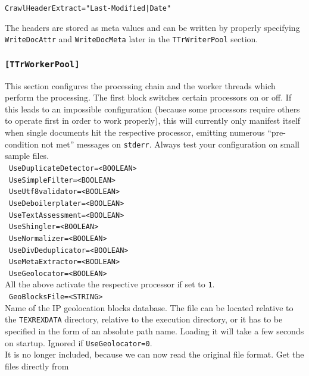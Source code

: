 \documentclass[12pt,a4paper]{article}
\begin{document}
\begin{center}
  \texttt{CrawlHeaderExtract="Last-Modified|Date"}
\end{center}

The headers are stored as meta values and can be written by properly specifying \texttt{WriteDocAttr} and \texttt{WriteDocMeta} later in the \texttt{TTrWriterPool} section.

\subsubsection{\texttt{[TTrWorkerPool]}}
\label{sec:workerpool}

This section configures the processing chain and the worker threads which perform the processing.
The first block switches certain processors on or off.
If this leads to an impossible configuration (because some processors require others to operate first in order to work properly), this will currently only manifest itself when single documents hit the respective processor, emitting numerous ``pre-condition not met'' messages on \texttt{stderr}.
Always test your configuration on small sample files.\\

\noindent\textbullet~\texttt{UseDuplicateDetector=<BOOLEAN>}\\
\noindent\textbullet~\texttt{UseSimpleFilter=<BOOLEAN>}\\
\noindent\textbullet~\texttt{UseUtf8validator=<BOOLEAN>}\\
\noindent\textbullet~\texttt{UseDeboilerplater=<BOOLEAN>}\\
\noindent\textbullet~\texttt{UseTextAssessment=<BOOLEAN>}\\
\noindent\textbullet~\texttt{UseShingler=<BOOLEAN>}\\
\noindent\textbullet~\texttt{UseNormalizer=<BOOLEAN>}\\
\noindent\textbullet~\texttt{UseDivDeduplicator=<BOOLEAN>}\\
\noindent\textbullet~\texttt{UseMetaExtractor=<BOOLEAN>}\\
\noindent\textbullet~\texttt{UseGeolocator=<BOOLEAN>}\\

All the above activate the respective processor if set to \texttt{1}.\\

\noindent\textbullet~\texttt{GeoBlocksFile=<STRING>}\\

Name of the IP geolocation blocks database.
The file can be located relative to the \texttt{TEXREXDATA} directory, relative to the execution directory, or it has to be specified in the form of an absolute path name.
Loading it will take a few seconds on startup.
Ignored if \texttt{UseGeolocator=0}.\\
It is no longer included, because we can now read the original file format.
Get the files directly from
\end{document}
